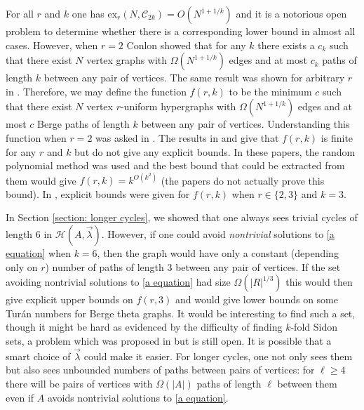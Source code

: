 \documentclass[12pt]{article}%
\def\mike#1{\noindent
\textcolor{green}
{\textsc{(Mike:}
\textsf{#1})}}
\begin{document}
For all $r$ and $k$ one has $\mathrm{ex}_r(N, \mathcal{C}_{2k}) = O(N^{1+1/k})$ and it is a notorious open problem to determine whether there is a corresponding lower bound in almost all cases. However, when $r=2$ Conlon \cite{conlon2} showed that for any $k$ there exists a $c_k$ such that there exist $N$ vertex graphs with $\Omega(N^{1+1/k})$ edges and at most $c_k$ paths of length $k$ between any pair of vertices. The same result was shown for arbitrary $r$ in \cite{sunny}. Therefore, we may define the function $f(r,k)$ to be the minimum $c$ such that there exist $N$ vertex $r$-uniform hypergraphs with $\Omega(N^{1+1/k})$ edges and at most $c$ Berge paths of length $k$ between any pair of vertices. Understanding this function when $r=2$ was asked in \cite{conlon3}. The results in \cite{conlon2} and \cite{sunny} give that $f(r,k)$ is finite for any $r$ and $k$ but do not give any explicit bounds. In these papers, the random polynomial method was used and the best bound that could be extracted from them would give $f(r,k) = k^{O(k^2)}$ (the papers do not actually prove this bound). In \cite{ge2, ge3, ge1}, explicit bounds were given for $f(r,k)$ when $r\in \{2,3\}$ and $k=3$. 

In Section \ref{section: longer cycles}, we showed that one always sees trivial cycles of length $6$ in $\mathcal{H}(A,\vec{\lambda})$. However, if one could avoid {\em nontrivial} solutions to \eqref{a equation} when $k=6$, then the graph would have only a constant (depending only on $r$) number of paths of length $3$ between any pair of vertices. If the set avoiding nontrivial solutions to \eqref{a equation} had size $\Omega(|R|^{1/3})$ this would then give explicit upper bounds on $f(r,3)$ and would give lower bounds on some Tur\'an numbers for Berge theta graphs. It would be interesting to find such a set, though it might be hard as evidenced by the difficulty of finding $k$-fold Sidon sets, a problem which was proposed in \cite{LV} but is still open. It is possible that a smart choice of $\vec{\lambda}$ could make it easier. For longer cycles, one not only sees them but also sees unbounded numbers of paths between pairs of vertices: for $\ell \geq 4$ there will be pairs of vertices with $\Omega(|A|)$ paths of length $\ell$ between them even if $A$ avoids nontrivial solutions to \eqref{a equation}.


\end{document}
